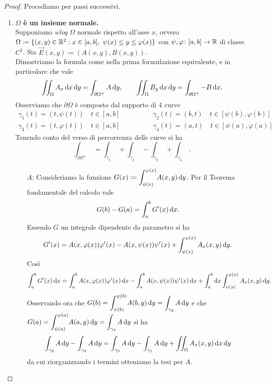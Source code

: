 \begin{proof}
	Procediamo per passi successivi.
	\begin{enumerate}[label = \arabic*.]
		\item \textbf{$ \Omega $ è un insieme normale.} \\
		Supponiamo \emph{wlog} $ \Omega $ normale rispetto all'asse $ x $, ovvero $ \Omega \coloneqq \{(x, y) \in \mathbb{R}^2 : x \in [a, b], \ \psi(x) \leq y \leq \varphi(x)\} $ con $ \psi, \varphi \colon [a, b] \to \mathbb{R} $ di classe $ C^1 $. Sia $ \vec{E}(x, y) \coloneqq (A(x, y), B(x, y)) $. \\
		Dimostriamo la formula come nella prima formulazione equivalente, e in particolare che vale
		\[
			\iint_{\Omega} A_x \dif{x} \dif{y} = \int_{\partial \Omega^+} A \dif{y}, \qquad \iint_{\Omega} B_y \dif{x} \dif{y} = \int_{\partial \Omega^+} - B \dif{x}.
		\]
		Osserviamo che $ \partial \Omega $ è composto dal supporto di 4 curve
		\begin{align*}
			\gamma_1(t) = (t, \psi(t)) \quad t \in [a, b] & \qquad \qquad \gamma_2(t) = (b, t) \quad t \in [\psi(b), \varphi(b)] \\
			\gamma_3(t) = (t, \varphi(t)) \quad t \in [a, b] &  \qquad \qquad \gamma_4(t) = (a, t) \quad t \in [\psi(a), \varphi(a)]
		\end{align*}
		Tenendo conto del verso di percorrenza delle curve si ha 
		\[
			\int_{\partial \Omega^+} \ = \int_{\gamma_1} \ + \int_{\gamma_2} \ - \int_{\gamma_3} \ + \int_{\gamma_4} \ .
		\]
		\begin{enumerate}
			\item[$ A $: ] Consideriamo la funzione $ G(x) \coloneqq \displaystyle{\int_{\psi(x)}^{\varphi(x)}} A(x, y) \dif{y} $. Per il Teorema fondamentale del calcolo vale
			\[
				G(b) - G(a) = \int_{a}^{b} G'(x) \dif{x}.
			\] 
			Essendo $ G $ un integrale dipendente da parametro si ha
			\[
				G'(x) = A(x, \varphi(x)) \varphi'(x) - A(x, \psi(x)) \psi'(x) + \int_{\psi(x)}^{\varphi(x)} A_x(x, y) \dif{y}.
			\]
			Così
			\[
				\int_{a}^{b} G'(x) \dif{x} = \int_{a}^{b} A(x, \varphi(x)) \varphi'(x) \dif{x} - \int_{a}^{b}  A(x, \psi(x)) \psi'(x) \dif{x} + \int_{a}^{b} \dif{x} \int_{\psi(x)}^{\varphi(x)} A_x(x, y) \dif{y}. 
			\]
			Osservando ora che $ G(b) = \displaystyle{\int_{\psi(b)}^{\varphi(b)}} A(b, y) \dif{y} = \int_{\gamma_2} A \dif{y} $ e che $ G(a) = \displaystyle{\int_{\psi(a)}^{\varphi(a)}} A(a, y) \dif{y} = \int_{\gamma_4} A \dif{y} $ si ha 
			\[
				\int_{\gamma_2} A \dif{y} - \int_{\gamma_4} A \dif{y} = \int_{\gamma_3} A \dif{y} - \int_{\gamma_1} A \dif{y} + \iint_{\Omega} A_x(x, y) \dif{x} \dif{y}
			\]
			da cui riorganizzando i termini otteniamo la tesi per $ A $. 
			

\end{enumerate}
\end{enumerate}
\end{proof}
